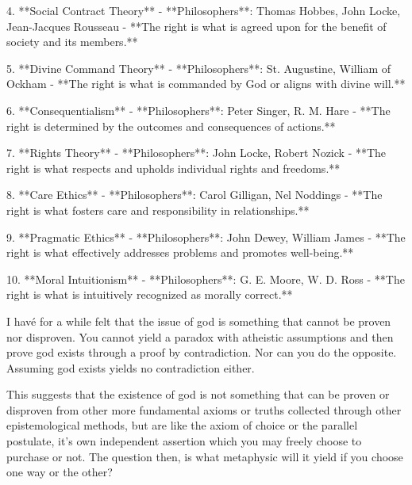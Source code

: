 4. **Social Contract Theory**  
   - **Philosophers**: Thomas Hobbes, John Locke, Jean-Jacques Rousseau  
   - **The right is what is agreed upon for the benefit of society and its members.**

5. **Divine Command Theory**  
   - **Philosophers**: St. Augustine, William of Ockham  
   - **The right is what is commanded by God or aligns with divine will.**

6. **Consequentialism**  
   - **Philosophers**: Peter Singer, R. M. Hare  
   - **The right is determined by the outcomes and consequences of actions.**

7. **Rights Theory**  
   - **Philosophers**: John Locke, Robert Nozick  
   - **The right is what respects and upholds individual rights and freedoms.**

8. **Care Ethics**  
   - **Philosophers**: Carol Gilligan, Nel Noddings  
   - **The right is what fosters care and responsibility in relationships.**

9. **Pragmatic Ethics**  
   - **Philosophers**: John Dewey, William James  
   - **The right is what effectively addresses problems and promotes well-being.**

10. **Moral Intuitionism**  
    - **Philosophers**: G. E. Moore, W. D. Ross  
    - **The right is what is intuitively recognized as morally correct.**



    I havé for a while felt that the issue of god is something that cannot be proven nor disproven. You cannot yield a paradox with atheistic assumptions and then prove god exists through a proof by contradiction. Nor can you do the opposite. Assuming god exists yields no contradiction either. 

This suggests that the existence of god is not something that can be proven or disproven from other more fundamental axioms or truths collected through other epistemological methods, but are like the axiom of choice or the parallel postulate, it’s own independent assertion which you may freely choose to purchase or not. The question then, is what metaphysic will it yield if you choose one way or the other? 



